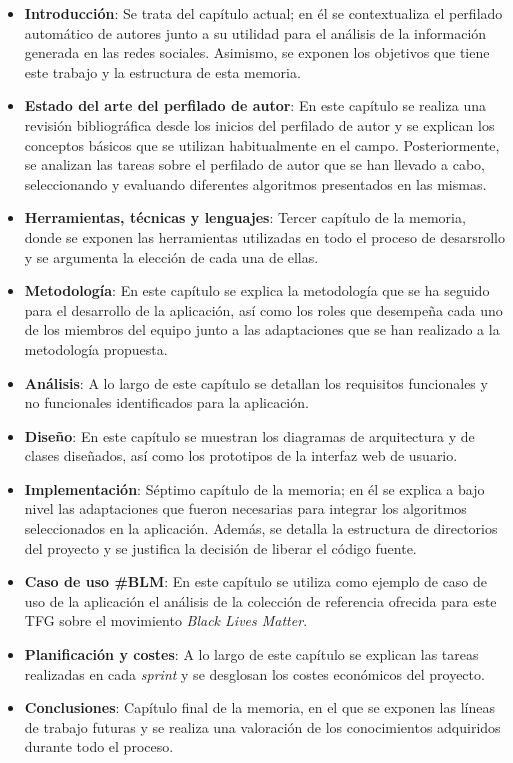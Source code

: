 \begin{itemize}
	\item \textbf{Introducción}: Se trata del capítulo actual; en él se contextualiza el perfilado automático de autores junto a su utilidad
	      para el análisis de la información generada en las redes sociales. Asimismo, se exponen los objetivos que tiene este trabajo y la estructura
	      de esta memoria.

	\item \textbf{Estado del arte del perfilado de autor}: En este capítulo se realiza una revisión bibliográfica desde los inicios del perfilado de autor y se explican
	      los conceptos básicos que se utilizan habitualmente en el campo. Posteriormente, se analizan las tareas sobre el perfilado de autor que se han llevado a cabo,
	      seleccionando y evaluando diferentes algoritmos presentados en las mismas.

	\item \textbf{Herramientas, técnicas y lenguajes}: Tercer capítulo de la memoria, donde se exponen las herramientas utilizadas en todo el proceso de desarsrollo
	      y se argumenta la elección de cada una de ellas.

	\item \textbf{Metodología}: En este capítulo se explica la metodología que se ha seguido para el desarrollo de la aplicación, así como
	      los roles que desempeña cada uno de los miembros del equipo junto a las adaptaciones que se han realizado a la metodología propuesta.

	\item \textbf{Análisis}: A lo largo de este capítulo se detallan los requisitos funcionales y no funcionales identificados para la aplicación.

	\item \textbf{Diseño}: En este capítulo se muestran los diagramas de arquitectura y de clases diseñados, así como los prototipos de la interfaz web de usuario.

	\item \textbf{Implementación}: Séptimo capítulo de la memoria; en él se explica a bajo nivel las adaptaciones que fueron necesarias para integrar los algoritmos
	      seleccionados en la aplicación. Además, se detalla la estructura de directorios del proyecto y se justifica la decisión de liberar el código fuente.

	\item \textbf{Caso de uso \#BLM}: En este capítulo se utiliza como ejemplo de caso de uso de la aplicación el análisis de la colección de referencia ofrecida para este TFG
	      sobre el movimiento \textit{Black Lives Matter}.

	\item \textbf{Planificación y costes}: A lo largo de este capítulo se explican las tareas realizadas en cada \textit{sprint} y se desglosan los costes
	      económicos del proyecto.

	\item \textbf{Conclusiones}: Capítulo final de la memoria, en el que se exponen las líneas de trabajo futuras y se realiza una valoración de los conocimientos
	      adquiridos durante todo el proceso.

\end{itemize}
